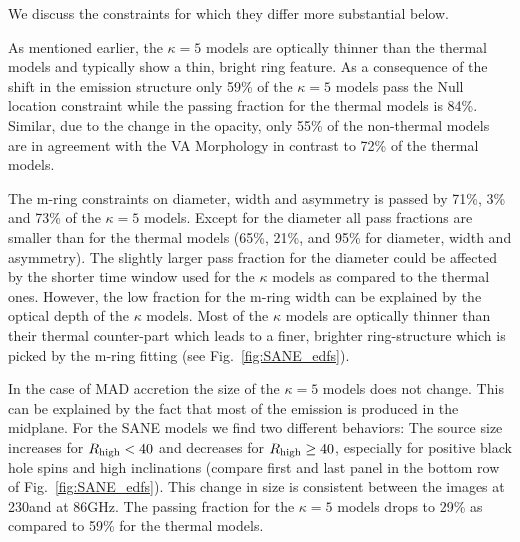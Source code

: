 We discuss the constraints for which they differ more substantial below.


As mentioned earlier, the $\kappa=5$ models are optically thinner than the thermal models and typically show a thin, bright ring feature.
As a consequence of the shift in the emission structure only 59\% of the $\kappa=5$ models pass the Null location constraint while the passing fraction for the thermal models is 84\%.
Similar, due to the change in the opacity, only 55\% of the non-thermal models are in agreement with the VA Morphology in contrast to 72\% of the thermal models.


The m-ring constraints on diameter, width and asymmetry is passed by 71\%, 3\% and 73\% of the $\kappa=5$ models.
Except for the diameter all pass fractions are smaller than for the thermal models (65\%, 21\%, and 95\% for diameter, width and asymmetry).
The slightly larger pass fraction for the diameter could be affected by the shorter time window used for the $\kappa$ models as compared to the thermal ones.
However, the low fraction for the m-ring width can be explained by the optical depth of the $\kappa$ models.
Most of the $\kappa$ models are optically thinner than their thermal counter-part which leads to a finer, brighter ring-structure which is picked by the m-ring fitting (see Fig.~\ref{fig:SANE_edfs}).


In the case of MAD accretion the size of the $\kappa=5$ models does not change.
This can be explained by the fact that most of the emission is produced in the midplane.
For the SANE models we find two different behaviors: The source size increases for $R_{\rm high}<40$ and decreases for $R_{\rm high}\geq 40$, especially for positive black hole spins and high inclinations (compare first and last panel in the bottom row of Fig.~\ref{fig:SANE_edfs}).
This change in size is consistent between the images at 230\GHz and at 86GHz.
The passing fraction for the $\kappa=5$ models drops to 29\% as compared to 59\% for the thermal models.


